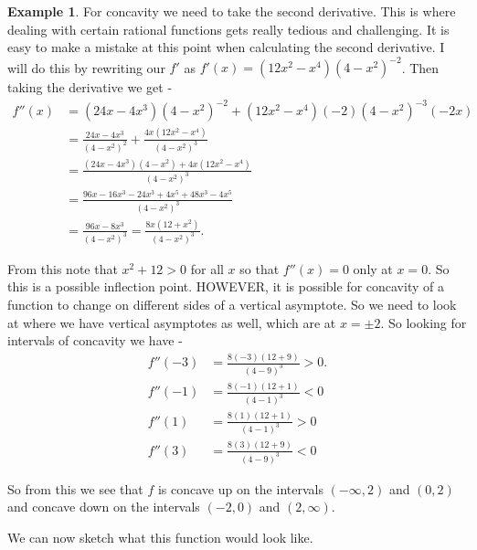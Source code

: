 \documentclass[12pt,reqno]{article}
\theoremstyle{definition}
\newtheorem*{Example}{Example}
\begin{document}
\begin{Example}
	For concavity we need to take the second derivative. This is where dealing with certain rational functions gets really tedious and challenging. It is easy to make a mistake at this point when calculating the second derivative. I will do this by rewriting our $f'$ as $f'(x) = (12x^2 - x^4)(4 - x^2)^{-2}$. Then taking the derivative we get -
	\begin{align*}
		f''(x) &= (24x - 4x^3)(4 - x^2)^{-2} + (12x^2 - x^4)(-2)(4 - x^2)^{-3}(-2x) \\
			   &= \frac{24x - 4x^3}{(4 -x^2)^{2}} + \frac{4x(12x^2 - x^4)}{(4 - x^2)^3} \\
			   &= \frac{(24x - 4x^3)(4 - x^2) + 4x(12x^2 - x^4)}{(4 - x^2)^3} \\
			   &= \frac{96x - 16x^3 - 24x^3 + 4x^5 + 48x^3 - 4x^5}{(4 - x^2)^3} \\
			   &= \frac{96x - 8x^3}{(4 - x^2)^3} = \frac{8x (12 + x^2)}{(4 - x^2)^3}. 
	\end{align*}
	
	From this note that $x^2 + 12 > 0$ for all $x$ so that $f''(x) = 0$ only at $x = 0$. So this is a possible inflection point. HOWEVER, it is possible for concavity of a function to change on different sides of a vertical asymptote. So we need to look at where we have vertical asymptotes as well, which are at $x = \pm 2$. So looking for intervals of concavity we have - 
	\begin{align*}
		f''(-3) &= \frac{8(-3)(12 + 9)}{(4 - 9)^{3}} > 0. \\
		f''(-1) &= \frac{8(-1)(12 + 1)}{(4 - 1)^3 } < 0 \\
		f''(1) &= \frac{8(1) (12 + 1)}{(4 - 1)^3 } > 0 \\ 
		f''(3) &= \frac{8(3) (12 + 9)}{(4 - 9)^3} < 0
	\end{align*}
	
	So from this we see that $f$ is concave up on the intervals $(-\infty, 2)$ and $(0, 2)$ and concave down on the intervals $(-2, 0)$ and $(2, \infty)$. 
	
	We can now sketch what this function would look like. 
	
\end{Example}
\end{document}
